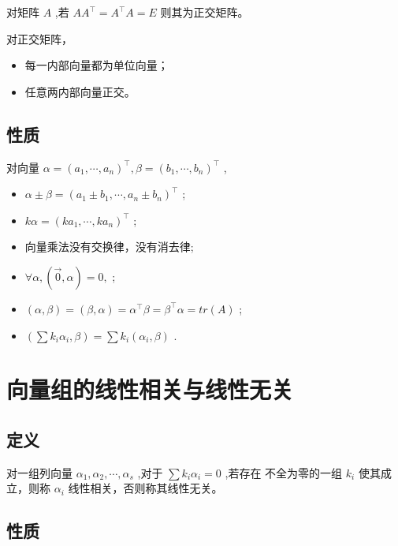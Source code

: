 对矩阵 $ A $ ,若 $ AA^\top = A^\top A = E $ 则其为正交矩阵。

对正交矩阵，\begin{itemize}
    \item 每一内部向量都为单位向量；
    \item 任意两内部向量正交。
\end{itemize}

\subsection{性质}

对向量 $ \alpha = (a_1,\cdots,a_n)^\top,\beta = (b_1,\cdots,b_n)^\top $ ,
\begin{itemize}
    \item $ \alpha\pm\beta = (a_1\pm b_1,\cdots,a_n\pm b_n)^\top $ ;
    \item $ k\alpha = (ka_1,\cdots,ka_n)^\top $ ;
    \item 向量乘法没有交换律，没有消去律;
    \item $\forall \alpha, (\vec 0,\alpha) = 0, $ ;
    \item $ (\alpha,\beta) = (\beta,\alpha) = \alpha^\top\beta = \beta^\top\alpha = tr(A) $ ;
    \item $ (\sum k_i\alpha_i,\beta) = \sum k_i(\alpha_i,\beta) $ .
\end{itemize}

\section{向量组的线性相关与线性无关}

\subsection{定义}

对一组列向量 $ \alpha_1,\alpha_2,\cdots,\alpha_s $ ,对于 $ \sum k_i\alpha_i = 0 $ ,若存在
不全为零的一组 $ k_i $ 使其成立，则称 $ \alpha_i $ 线性相关，否则称其线性无关。

\subsection{性质}

